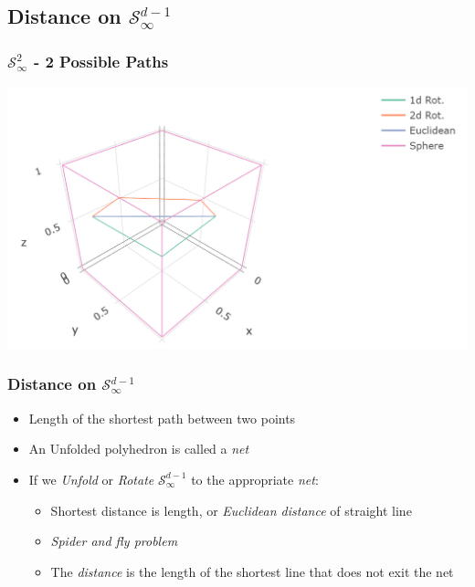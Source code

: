 \documentclass[aspectratio=169]{beamer}
\begin{document}
\subsection{Distance on $\mathcal{S}_{\infty}^{d-1}$}
\begin{frame}
  \frametitle{$\mathcal{S}_{\infty}^{2}$ - 2 Possible Paths}
  \begin{center}
    \includegraphics[width=0.8\linewidth]{./images/rotation}
  \end{center}
\end{frame}

\begin{frame}
  \frametitle{Distance on $\mathcal{S}_{\infty}^{d-1}$}
  \begin{itemize}
    \item Length of the shortest path between two points
    \pause
    \item An Unfolded polyhedron is called a \emph{net}
    \pause
    \item If we \emph{Unfold} or \emph{Rotate} $\mathcal{S}_{\infty}^{d-1}$ to the appropriate \emph{net}:
        \begin{itemize}
            \item Shortest distance is length, or \emph{Euclidean distance} of straight line \citep{pappas1989}
            \item \emph{Spider and fly problem}
            \item The \emph{distance} is the length of the shortest line that does not exit the net
        \end{itemize}
  \end{itemize}
\end{frame}
\end{document}
